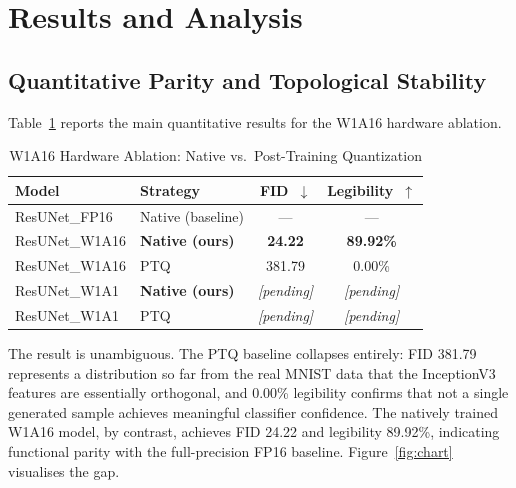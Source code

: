 \documentclass[conference]{IEEEtran}
\begin{document}
\section{Results and Analysis}

\subsection{Quantitative Parity and Topological Stability}

Table~\ref{tab:main} reports the main quantitative results for the W1A16 hardware
ablation.

\begin{table}[h]
\centering
\caption{W1A16 Hardware Ablation: Native vs.\ Post-Training Quantization}
\label{tab:main}
\begin{tabular}{@{}llcc@{}}
\toprule
\textbf{Model} & \textbf{Strategy} & \textbf{FID~$\downarrow$} &
\textbf{Legibility~$\uparrow$} \\
\midrule
ResUNet\_FP16  & Native (baseline) & ---    & ---     \\
ResUNet\_W1A16 & \textbf{Native (ours)} & \textbf{24.22}  & \textbf{89.92\%} \\
ResUNet\_W1A16 & PTQ               & 381.79 & 0.00\%  \\
\midrule
ResUNet\_W1A1  & \textbf{Native (ours)} & \emph{[pending]} & \emph{[pending]} \\
ResUNet\_W1A1  & PTQ               & \emph{[pending]} & \emph{[pending]} \\
\bottomrule
\end{tabular}
\end{table}

The result is unambiguous. The PTQ baseline collapses entirely: FID 381.79 represents a
distribution so far from the real MNIST data that the InceptionV3 features are
essentially orthogonal, and 0.00\% legibility confirms that not a single generated
sample achieves meaningful classifier confidence. The natively trained W1A16 model, by
contrast, achieves FID 24.22 and legibility 89.92\%, indicating functional parity with
the full-precision FP16 baseline. Figure~\ref{fig:chart} visualises the gap.
\end{document}
